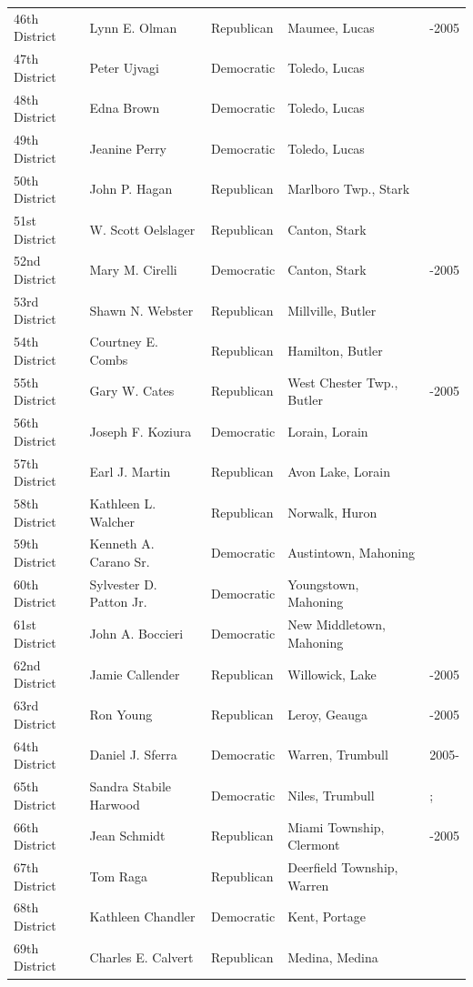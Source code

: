 \documentclass{article}
\begin{document}
\begin{tabular}{lllll}
46th District & Lynn E. Olman & Republican & Maumee, Lucas & -2005 \\
47th District & Peter Ujvagi & Democratic & Toledo, Lucas &  \\
48th District & Edna Brown & Democratic & Toledo, Lucas &  \\
49th District & Jeanine Perry & Democratic & Toledo, Lucas &  \\
50th District & John P. Hagan & Republican & Marlboro Twp., Stark &  \\
51st District & W. Scott Oelslager & Republican & Canton, Stark &  \\
52nd District & Mary M. Cirelli & Democratic & Canton, Stark & -2005 \\
53rd District & Shawn N. Webster & Republican & Millville, Butler &  \\
54th District & Courtney E. Combs & Republican & Hamilton, Butler &  \\
55th District & Gary W. Cates & Republican & West Chester Twp., Butler & -2005 \\
56th District & Joseph F. Koziura & Democratic & Lorain, Lorain &  \\
57th District & Earl J. Martin & Republican & Avon Lake, Lorain &  \\
58th District & Kathleen L. Walcher & Republican & Norwalk, Huron &  \\
59th District & Kenneth A. Carano Sr. & Democratic & Austintown, Mahoning &  \\
60th District & Sylvester D. Patton Jr. & Democratic & Youngstown, Mahoning &  \\
61st District & John A. Boccieri & Democratic & New Middletown, Mahoning &  \\
62nd District & Jamie Callender & Republican & Willowick, Lake & -2005 \\
63rd District & Ron Young & Republican & Leroy, Geauga & -2005 \\
64th District & Daniel J. Sferra & Democratic & Warren, Trumbull & 2005- \\
65th District & Sandra Stabile Harwood & Democratic & Niles, Trumbull & ; \\
66th District & Jean Schmidt & Republican & Miami Township, Clermont & -2005 \\
67th District & Tom Raga & Republican & Deerfield Township, Warren &  \\
68th District & Kathleen Chandler & Democratic & Kent, Portage &  \\
69th District & Charles E. Calvert & Republican & Medina, Medina &  \\

\end{tabular}
\end{document}
